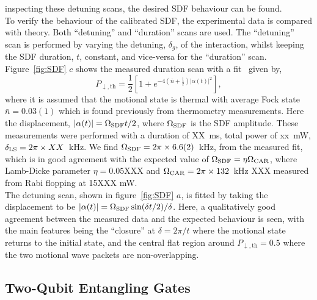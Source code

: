     inspecting these detuning scans, the desired SDF behaviour can be found. \\
    To verify the behaviour of the calibrated SDF, the experimental data is compared with theory. Both
    ``detuning'' and ``duration'' scans are used. The ``detuning'' scan is performed by
    varying the detuning, $\delta_g$, of the interaction, whilst keeping the
    SDF duration, $t$, constant, and vice-versa for the ``duration'' scan. \\
    Figure~\ref{fig:SDF} $c$ shows the measured duration scan with a fit~\cite{} given by,
    \begin{equation}
        P_{\downarrow,\mathrm{th}} = \frac{1}{2} \left[ 1 + e^{-4\left( \bar{n} + \frac{1}{2} \right) |\alpha(t)|^2} \right],
    \end{equation}
    where it is assumed that the motional state is thermal with average Fock state $\bar{n}
    = 0.03(1)$ which is found previously from thermometry measurements. Here the
    displacement, $|\alpha(t)| = \Omega_{\rm SDF} t/2$, where $\Omega_{\rm SDF}$ is the
    SDF amplitude. 
    These measurements were performed with a duration of XX~ms, total power of xx~mW, $\delta_{\rm LS}=2\pi\times XX$~\unit{\kHz}.
    We find $\Omega_{\rm SDF} = 2\pi\times 6.6(2)$~\unit{\kHz}, from the
    measured fit, which is in good agreement with the expected value of
    $\Omega_{\rm SDF} = \eta\Omega_{\rm CAR}$, where Lamb-Dicke parameter $\eta =
    0.05$XXX and $\Omega_{\rm CAR} = 2\pi \times 132$~\unit{\kHz} XXX measured from Rabi
    flopping at 15XXX mW.\\
    The detuning scan, shown in figure~\ref{fig:SDF} $a$, is fitted by taking the
    displacement to be $|\alpha(t)| = \Omega_{\rm SDF} \sin(\delta t/2)/\delta$. Here,
    a qualitatively good agreement between the measured data and the
    expected behaviour is seen, with the main features being the ``closure''
    at $\delta = 2\pi/t$ where the motional state returns to the initial state,
    and the central flat region around $P_{\downarrow, \mathrm{th}} =0.5$ where
    the two motional wave packets are non-overlapping.\\


\subsection{Two-Qubit Entangling Gates}
\label{sec:Two-Qubit Entangling Gates}

